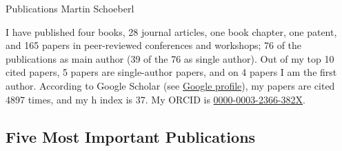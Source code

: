 \documentclass[%
    a4paper,
    11pt, %
    headinclude, footexclude,
    notitlepage,
    headsepline,
    pointlessnumbers,
    ]{scrartcl}
\begin{document}
\pagestyle{scrheadings}

\begin{center}
\vspace{3cm}
{\huge Publications Martin Schoeberl}\\
\bigskip
\bigskip
\end{center}

I have published four books, 28 journal articles, one book chapter, one patent, and 165
papers in peer-reviewed conferences and workshops; 76 of the publications
as main author (39 of the 76 as single author).
Out of my top 10 cited papers, 5 papers are single-author papers, and on 4 papers
I am the first author.
According to Google Scholar (see \href{http://scholar.google.com/citations?user=wiRNmwUAAAAJ&hl=en&oi=ao}{Google profile}),
my papers are cited 4897 times, and my h index is 37.
My ORCID is  \href{https://orcid.org/0000-0003-2366-382X}{0000-0003-2366-382X}.


\subsection*{Five Most Important Publications}
\end{document}
